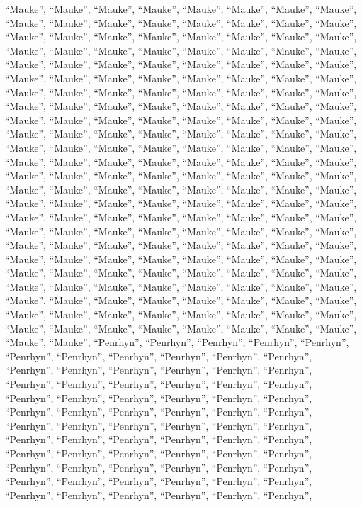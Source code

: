 \documentclass[
  ,man]{apa6}
\begin{document}
``Mauke'', ``Mauke'', ``Mauke'', ``Mauke'', ``Mauke'', ``Mauke'', ``Mauke'', ``Mauke'', ``Mauke'', ``Mauke'', ``Mauke'', ``Mauke'', ``Mauke'', ``Mauke'', ``Mauke'', ``Mauke'', ``Mauke'', ``Mauke'', ``Mauke'', ``Mauke'', ``Mauke'', ``Mauke'', ``Mauke'', ``Mauke'', ``Mauke'', ``Mauke'', ``Mauke'', ``Mauke'', ``Mauke'', ``Mauke'', ``Mauke'', ``Mauke'', ``Mauke'', ``Mauke'', ``Mauke'', ``Mauke'', ``Mauke'', ``Mauke'', ``Mauke'', ``Mauke'', ``Mauke'', ``Mauke'', ``Mauke'', ``Mauke'', ``Mauke'', ``Mauke'', ``Mauke'', ``Mauke'', ``Mauke'', ``Mauke'', ``Mauke'', ``Mauke'', ``Mauke'', ``Mauke'', ``Mauke'', ``Mauke'',
``Mauke'', ``Mauke'', ``Mauke'', ``Mauke'', ``Mauke'', ``Mauke'', ``Mauke'', ``Mauke'', ``Mauke'', ``Mauke'', ``Mauke'', ``Mauke'', ``Mauke'', ``Mauke'', ``Mauke'', ``Mauke'', ``Mauke'', ``Mauke'', ``Mauke'', ``Mauke'', ``Mauke'', ``Mauke'', ``Mauke'', ``Mauke'', ``Mauke'', ``Mauke'', ``Mauke'', ``Mauke'', ``Mauke'', ``Mauke'', ``Mauke'', ``Mauke'', ``Mauke'', ``Mauke'', ``Mauke'', ``Mauke'', ``Mauke'', ``Mauke'', ``Mauke'', ``Mauke'', ``Mauke'', ``Mauke'', ``Mauke'', ``Mauke'', ``Mauke'', ``Mauke'', ``Mauke'', ``Mauke'', ``Mauke'', ``Mauke'', ``Mauke'', ``Mauke'', ``Mauke'', ``Mauke'', ``Mauke'', ``Mauke'',
``Mauke'', ``Mauke'', ``Mauke'', ``Mauke'', ``Mauke'', ``Mauke'', ``Mauke'', ``Mauke'', ``Mauke'', ``Mauke'', ``Mauke'', ``Mauke'', ``Mauke'', ``Mauke'', ``Mauke'', ``Mauke'', ``Mauke'', ``Mauke'', ``Mauke'', ``Mauke'', ``Mauke'', ``Mauke'', ``Mauke'', ``Mauke'', ``Mauke'', ``Mauke'', ``Mauke'', ``Mauke'', ``Mauke'', ``Mauke'', ``Mauke'', ``Mauke'', ``Mauke'', ``Mauke'', ``Mauke'', ``Mauke'', ``Mauke'', ``Mauke'', ``Mauke'', ``Mauke'', ``Mauke'', ``Mauke'', ``Mauke'', ``Mauke'', ``Mauke'', ``Mauke'', ``Mauke'', ``Mauke'', ``Mauke'', ``Mauke'', ``Mauke'', ``Mauke'', ``Mauke'', ``Mauke'', ``Mauke'', ``Mauke'',
``Mauke'', ``Mauke'', ``Mauke'', ``Mauke'', ``Mauke'', ``Mauke'', ``Mauke'', ``Mauke'', ``Mauke'', ``Mauke'', ``Mauke'', ``Mauke'', ``Mauke'', ``Mauke'', ``Mauke'', ``Mauke'', ``Mauke'', ``Mauke'', ``Mauke'', ``Mauke'', ``Mauke'', ``Mauke'', ``Mauke'', ``Mauke'', ``Mauke'', ``Mauke'', ``Penrhyn'', ``Penrhyn'', ``Penrhyn'', ``Penrhyn'', ``Penrhyn'', ``Penrhyn'', ``Penrhyn'', ``Penrhyn'', ``Penrhyn'', ``Penrhyn'', ``Penrhyn'', ``Penrhyn'', ``Penrhyn'', ``Penrhyn'', ``Penrhyn'', ``Penrhyn'', ``Penrhyn'', ``Penrhyn'', ``Penrhyn'', ``Penrhyn'', ``Penrhyn'', ``Penrhyn'', ``Penrhyn'', ``Penrhyn'', ``Penrhyn'',
``Penrhyn'', ``Penrhyn'', ``Penrhyn'', ``Penrhyn'', ``Penrhyn'', ``Penrhyn'', ``Penrhyn'', ``Penrhyn'', ``Penrhyn'', ``Penrhyn'', ``Penrhyn'', ``Penrhyn'', ``Penrhyn'', ``Penrhyn'', ``Penrhyn'', ``Penrhyn'', ``Penrhyn'', ``Penrhyn'', ``Penrhyn'', ``Penrhyn'', ``Penrhyn'', ``Penrhyn'', ``Penrhyn'', ``Penrhyn'', ``Penrhyn'', ``Penrhyn'', ``Penrhyn'', ``Penrhyn'', ``Penrhyn'', ``Penrhyn'', ``Penrhyn'', ``Penrhyn'', ``Penrhyn'', ``Penrhyn'', ``Penrhyn'', ``Penrhyn'', ``Penrhyn'', ``Penrhyn'', ``Penrhyn'', ``Penrhyn'', ``Penrhyn'', ``Penrhyn'', ``Penrhyn'', ``Penrhyn'', ``Penrhyn'', ``Penrhyn'',
\end{document}

